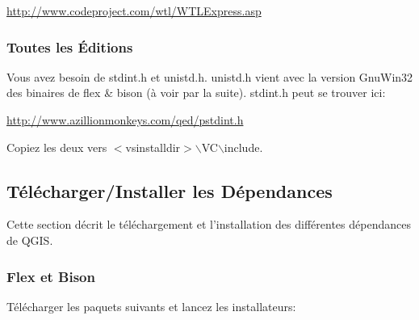 \url{http://www.codeproject.com/wtl/WTLExpress.asp}

% 
% 

\subsubsection{Toutes les \'Editions}
Vous avez besoin de stdint.h et unistd.h. unistd.h vient avec la version GnuWin32 des binaires de flex \& bison (\`a voir par la suite). stdint.h peut se trouver ici:

\url{http://www.azillionmonkeys.com/qed/pstdint.h}

Copiez les deux vers $<$vsinstalldir$>$$\backslash$VC$\backslash$include.


\subsection{T\'el\'echarger/Installer les D\'ependances}
Cette section d\'ecrit le t\'el\'echargement et l'installation des diff\'erentes d\'ependances de QGIS.

% 

\subsubsection{Flex et Bison}
T\'el\'echarger les paquets suivants et lancez les installateurs:

